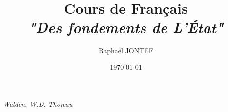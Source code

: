 \documentclass[a4paper,12pt]{article}
\title{Cours de Français\\ \Large \textit{"Des fondements de L'État"}}
\author{Raphaël JONTEF}
\date{\today}
\begin{document}
\maketitle





\textit{Walden, W.D. Thoreau} 
\end{document}
